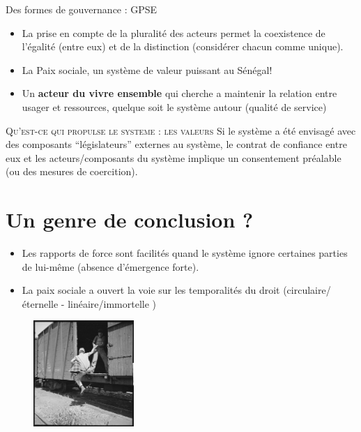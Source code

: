 \documentclass[newPxFont]{beamer}
\begin{document}
\begin{frame}[c]{Des formes de gouvernance : GPSE}
\vspace{-1cm}
\begin{itemize}
    \item La prise en compte de la pluralité des acteurs permet la coexistence de l’égalité (entre eux) et de la distinction (considérer chacun comme unique).
    \item La Paix sociale, un système de valeur puissant au Sénégal!
    \item Un \textbf{acteur du vivre ensemble} qui cherche a maintenir la relation entre usager et ressources, quelque soit le système autour (qualité de service)
\end{itemize}
 \small{
   \begin{alertblock}{\textsc{Qu'est-ce qui propulse le systeme : les valeurs }}
    Si le système a été envisagé avec des composants “législateurs” externes au système, le contrat de confiance entre eux et les acteurs/composants du système implique un consentement préalable (ou des mesures de coercition).
   \end{alertblock}
 }
\end{frame}


\section{Un genre de conclusion ?}

\begin{frame}[c]{}
\vspace{-1cm}
\begin{itemize}
    \item Les rapports de force sont facilités quand le système ignore certaines parties de lui-même (absence d'émergence forte).
    \item La paix sociale a ouvert la voie sur les temporalités du droit (circulaire/éternelle - linéaire/immortelle )
\end{itemize}

\begin{figure}
  \includegraphics[height=4cm]{img/valeurs.jpg}
\end{figure}


\end{frame}
\end{document}
